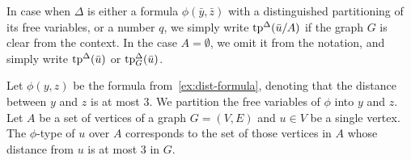 







 





In  case when $\Delta$ is either a formula $\phi(\bar y,\bar z)$ with a distinguished partitioning of its free variables, or a number $q$,
we simply write $\mathrm{tp}^\Delta(\bar u/A)$ if the graph $G$
is clear from the context. %
In the case $A=\emptyset$, we omit it from the notation, 
and simply write $\mathrm{tp}^\Delta(\bar u)$ or $\mathrm{tp}^\Delta_G(\bar u)$.

\begin{example}
Let $\phi(y,z)$	be the formula from~\cref{ex:dist-formula}, denoting that the distance between $y$ and $z$ is at most $3$.
We  partition  the free variables of $\phi$
into $y$ and $z$.
Let $A$ be a set of vertices of a graph $G=(V,E)$
and $u\in V$ be a single vertex.
The $\phi$-type of $u$ over $A$
corresponds to the set of those vertices in $A$
whose distance from $u$ is at most $3$ in $G$.
\end{example}


